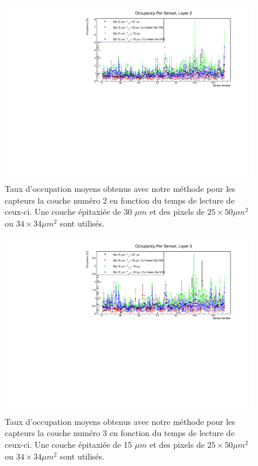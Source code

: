 \begin{appendices}
   \begin{figure}[!htb]
    \begin{center}
      \includegraphics[scale=0.80]{./figures/sensors_Readout_Time/resultOccupancyPerSensor/occupancyPerSensor_Layer2_epi30um.pdf}
      \caption{Taux d'occupation moyens obtenus avec notre m\'ethode pour les capteurs la couche num\'ero 2 en fonction du temps de lecture de ceux-ci. Une couche \'epitaxi\'ee de 30 $\mu m$ et des pixels de $25 \times 50 \mu m^2$ ou $34 \times 34 \mu m^2$ sont utilis\'es.}
      \label{fig:OccupancyLayer2_epi30um}
    \end{center}
  \end{figure}
  
   \begin{figure}[!htb]
    \begin{center}
      \includegraphics[scale=0.80]{./figures/sensors_Readout_Time/resultOccupancyPerSensor/occupancyPerSensor_Layer3_epi15um.pdf}
      \caption{Taux d'occupation moyens obtenus avec notre m\'ethode pour les capteurs la couche num\'ero 3 en fonction du temps de lecture de ceux-ci. Une couche \'epitaxi\'ee de 15 $\mu m$ et des pixels de $25 \times 50 \mu m^2$ ou $34 \times 34 \mu m^2$ sont utilis\'es.}
      \label{fig:OccupancyLayer3_epi15um}
    \end{center}
  \end{figure}


\end{appendices}
